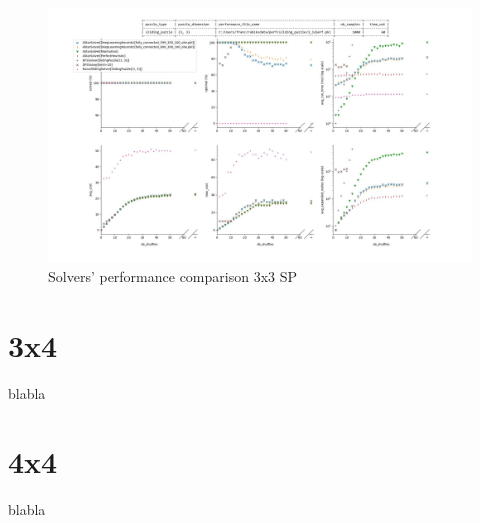\begin{landscape}
\centering\vspace*{\fill}
\begin{figure}[H]
\centering
\includegraphics[scale=0.63]{./Figures/33SPPerformance.jpeg}
\caption[33SPPerformance]{Solvers' performance comparison 3x3 SP}
\label{fig:33SPPerformance}
\end{figure}
\vfill
\end{landscape}
\restoregeometry


\section{3x4}

blabla


\section{4x4}

blabla
